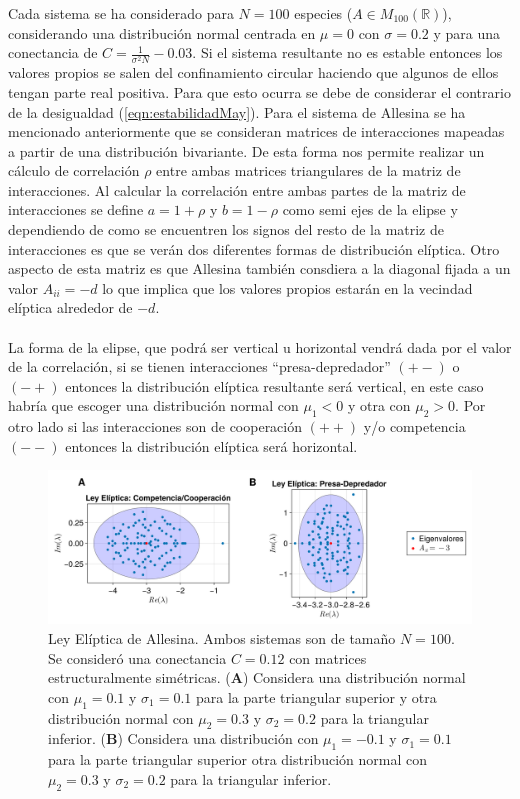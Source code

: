Cada sistema se ha considerado para $N=100$ especies ($A\in M_{100}(\mathbb{R})$), considerando una distribución normal centrada en $\mu=0$ con $\sigma=0.2$ y para una conectancia de $C=\frac{1}{\sigma^2 N}-0.03$. Si el sistema resultante no es estable entonces los valores propios se salen del confinamiento circular haciendo que algunos de ellos tengan parte real positiva. Para que esto ocurra se debe de considerar el contrario de la desigualdad (\ref{eqn:estabilidadMay}). 
\newpage
Para el sistema de Allesina \cite{allesina2012stability} se ha mencionado anteriormente que se consideran matrices de interacciones mapeadas a partir de una distribución bivariante. De esta forma nos permite realizar un cálculo de correlación $\rho$ entre ambas matrices triangulares de la matriz de interacciones. Al calcular la correlación entre ambas partes de la matriz de interacciones se define $a=1+\rho$ y $b=1-\rho$ como semi ejes de la elipse y dependiendo de como se encuentren los signos del resto de la matriz de interacciones es que se verán dos diferentes formas de distribución elíptica. Otro aspecto de esta matriz es que Allesina también consdiera a la diagonal fijada a un valor $A_{ii}= -d$ lo que implica que los valores propios estarán en la vecindad elíptica alrededor de $-d$.
\\
\\
La forma de la elipse, que podrá ser vertical u horizontal vendrá dada por el valor de la correlación, si se tienen interacciones ``presa-depredador'' $(+-)$ o $(-+)$ entonces la distribución elíptica resultante será vertical, en este caso habría que escoger una distribución normal con $\mu_1<0$ y otra con $\mu_2>0$. Por otro lado si las interacciones son de cooperación $(++)$ y/o competencia $(--)$ entonces la distribución elíptica será horizontal.
\begin{figure}[h!]
	\centering
	\includegraphics[scale=0.2]{../Imagenes/LeyElipticaAllesina}
	\caption{Ley Elíptica de Allesina. Ambos sistemas son de tamaño $N=100$. Se consideró una conectancia $C=0.12$ con matrices estructuralmente simétricas. (\textbf{A}) Considera una distribución normal con $\mu_1=0.1$ y $\sigma_1 = 0.1$ para la parte triangular superior y otra distribución normal con $\mu_2=0.3$ y $\sigma_2 = 0.2$ para la triangular inferior. (\textbf{B}) Considera una distribución con $\mu_1=-0.1$ y $\sigma_1=0.1$ para la parte triangular superior otra distribución normal con $\mu_2=0.3$ y $\sigma_2=0.2$ para la triangular inferior. }
	\label{fig:LeyElipticaAllesina}
\end{figure}

